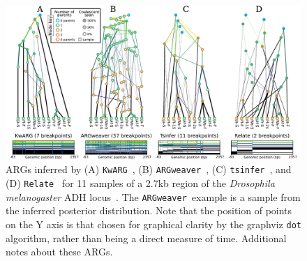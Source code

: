 \documentclass{article}
\newcommand{\tsinfer}[0]{\texttt{tsinfer}}
\newcommand{\kwarg}[0]{\texttt{KwARG}}
\newcommand{\argweaver}[0]{\texttt{ARGweaver}}
\newcommand{\relate}[0]{\texttt{Relate}}
\begin{document}


\begin{figure} \begin{center}
\includegraphics[width=\textwidth]{illustrations/inference.pdf} \end{center}
\caption{\label{fig-inferred-args} ARGs inferred by
(A) \kwarg~\citep{ignatieva2021kwarg},
(B) \argweaver~\citep{rasmussen2014genome,hubisz2020inference},
(C) \tsinfer~\citep{kelleher2019inferring},
and (D) \relate~\citep{speidel2019method}
for 11 samples of a 2.7kb region of the \textit{Drosophila melanogaster} ADH
locus~\citep{kreitman1983nucleotide}. The \argweaver\ example
is a sample from the inferred posterior distribution.
Note that the position of points on the
Y axis is that chosen for graphical clarity by the graphviz \texttt{dot}
algorithm,  rather than being
a direct measure of time. Additional notes about these ARGs.
}
\end{figure}
\end{document}
